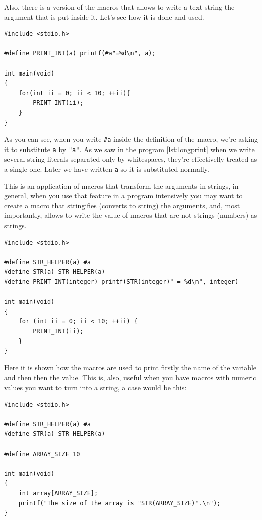 \documentclass[a4paper]{article}
\begin{document}
Also, there is a version of the macros that allows to write a text string the
argument that is put inside it. Let's see how it is done and used.

\noindent
\begin{minipage}[H]{\linewidth}
\mbox{}
\begin{lstlisting}[style=C,
caption={Use of macros with strings},
label={lst:macroText}]
#include <stdio.h>

#define PRINT_INT(a) printf(#a"=%d\n", a);

int main(void)
{
    for(int ii = 0; ii < 10; ++ii){
        PRINT_INT(ii);
    }
}
\end{lstlisting}
\end{minipage}

As you can see, when you write \verb!#a! inside the definition of the macro,
we're asking it to substitute \verb!a! by \verb!"a"!. As we saw in the program
\ref{lst:longprint} when we write several string literals separated only by
whitespaces, they're effectivelly treated as a single one. Later we have written
\verb!a! so it is substituted normally.

This is an application of macros that transform the arguments in strings, in
general, when you use that feature in a program intensively you may want to
create a macro that stringifies (converts to string) the arguments, and, most
importantly, allows to write the value of macros that are not strings (numbers)
as strings.

\noindent
\begin{minipage}[H]{\linewidth}
\mbox{}
\begin{lstlisting}[style=C,
caption={Macro to stringify},
label={lst:stringifyMacro}]
#include <stdio.h>

#define STR_HELPER(a) #a
#define STR(a) STR_HELPER(a)
#define PRINT_INT(integer) printf(STR(integer)" = %d\n", integer)

int main(void)
{
    for (int ii = 0; ii < 10; ++ii) {
        PRINT_INT(ii);
    }
}
\end{lstlisting}
\end{minipage}

Here it is shown how the macros are used to print firstly the name of the
variable and then then the value. This is, also, useful when you have macros
with numeric values you want to turn into a string, a case would be this:

\noindent
\begin{minipage}[H]{\linewidth}
\mbox{}
\begin{lstlisting}[style=C,
caption={Converting numeric macros to string},
label={lst:stringifyMacroAndMacro}]
#include <stdio.h>

#define STR_HELPER(a) #a
#define STR(a) STR_HELPER(a)

#define ARRAY_SIZE 10

int main(void)
{
    int array[ARRAY_SIZE];
    printf("The size of the array is "STR(ARRAY_SIZE)".\n");
}
\end{lstlisting}
\end{minipage}
\end{document}
